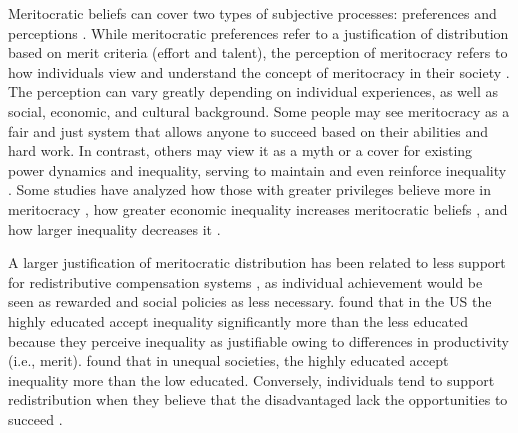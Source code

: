 \documentclass[
    behavsci,
    article,
    submit,
moreauthors
]{mdpi}
\begin{document}
Meritocratic beliefs can cover two types of subjective processes:
preferences and perceptions \citep{castillo_multidimensional_2023}.
While meritocratic preferences refer to a justification of distribution
based on merit criteria (effort and talent), the perception of
meritocracy refers to how individuals view and understand the concept of
meritocracy in their society
\citep{duru-bellat_who_2012, castillo_meritocracia_2019}. The perception
can vary greatly depending on individual experiences, as well as social,
economic, and cultural background. Some people may see meritocracy as a
fair and just system that allows anyone to succeed based on their
abilities and hard work. In contrast, others may view it as a myth or a
cover for existing power dynamics and inequality, serving to maintain
and even reinforce inequality
\citep{lampert_meritocratic_2013, mijs_paradox_2019}. Some studies have
analyzed how those with greater privileges believe more in meritocracy
\citep{reynolds_perceptions_2014}, how greater economic inequality
increases meritocratic beliefs \citep{mijs_paradox_2019}, and how larger
inequality decreases it \citep{morris_representing_2022}.

A larger justification of meritocratic distribution has been related to
less support for redistributive compensation systems
\citep{frank_performance_2015}, as individual achievement would be seen
as rewarded and social policies as less necessary.
\citet{almas_cutthroat_2020} found that in the US the highly educated
accept inequality significantly more than the less educated because they
perceive inequality as justifiable owing to differences in productivity
(i.e., merit). \citet{barr_effect_2020} found that in unequal societies,
the highly educated accept inequality more than the low educated.
Conversely, individuals tend to support redistribution when they believe
that the disadvantaged lack the opportunities to succeed
\citep{evans_strong_2018}.
\end{document}
